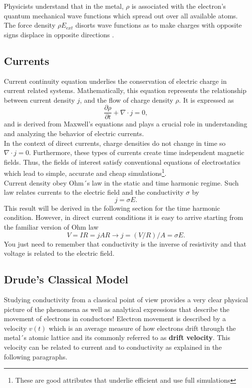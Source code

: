 Physicists understand that in the metal, $\rho$ is associated with the electron's quantum mechanical wave functions which spread out over all available atoms. The force density $\rho E_{ext}$ disorts wave functions as to make charges with opposite signs displace in opposite directions \cite{zangwill2013modern}.


\subsection{Currents}
Current continuity equation underlies the conservation of electric charge in current related systems. Mathematically, this equation represents the relationship between current density $j$, and the flow of charge density $\rho$. It is expressed as
\begin{equation}
    \label{eq:continuity}
    \frac{\partial \rho}{\partial t} + \nabla \cdot j = 0, 
\end{equation}
and is derived from Maxwell's equations and plays a crucial role in understanding and analyzing the behavior of electric currents.
\\

In the context of direct currents, charge densities do not change in time so $\nabla \cdot j = 0$. Furthermore, these types of currents create time independent magnetic fields. Thus, the fields of interest satisfy conventional equations of electrostatics which lead to simple, accurate and cheap simulations\footnote{These are good attributes that underlie efficient and use full simulations}.
\\

Current density obey Ohm´s law in the static and time harmonic regime. Such law relates currents to the electric field and the conductivity $\sigma$ by
\begin{equation}
    \label{eq:ohmlaw}
    j = \sigma E.
\end{equation}
This result will be derived in the following section for the time harmonic condition. However, in direct current conditions it is easy to arrive starting from the familiar version of Ohm law
\begin{equation*}
    V=IR=jAR \rightarrow  j = (V/R)/A = \sigma E .
\end{equation*}
You just need to remember that conductivity is the inverse of resistivity and that voltage is related to the electric field. 
\\

\subsection{Drude's Classical Model}
Studying conductivity from a classical point of view provides a very clear physical picture of the phenomena as well as analytical expressions that describe the movement of electrons in conductors! Electron movement is described by a velocity $v(t)$ which is an average measure of how electrons drift through the metal´s atomic lattice and its commonly referred to as \textbf{drift velocity}. This velocity can be related to current and to conductivity as explained in the following paragraphs. 
\\

